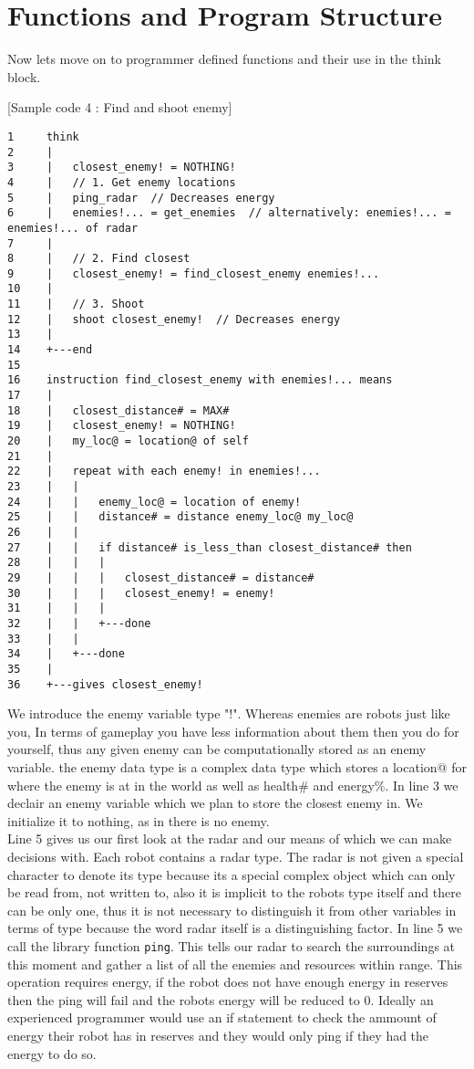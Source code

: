 \documentclass[a4paper]{article}
\begin{document}
\section{Functions and Program Structure}

Now lets move on to programmer defined functions and their use in the think block.

[Sample code 4 : Find and shoot enemy]
\begin{verbatim}
1     think
2     |
3     |   closest_enemy! = NOTHING!
4     |   // 1. Get enemy locations
5     |   ping_radar  // Decreases energy
6     |   enemies!... = get_enemies  // alternatively: enemies!... = enemies!... of radar
7     |
8     |   // 2. Find closest
9     |   closest_enemy! = find_closest_enemy enemies!...
10    |
11    |   // 3. Shoot
12    |   shoot closest_enemy!  // Decreases energy
13    |
14    +---end
15
16    instruction find_closest_enemy with enemies!... means
17    |
18    |   closest_distance# = MAX#
19    |   closest_enemy! = NOTHING!
20    |   my_loc@ = location@ of self
21    |
22    |   repeat with each enemy! in enemies!...
23    |   |
24    |   |   enemy_loc@ = location of enemy!
25    |   |   distance# = distance enemy_loc@ my_loc@
26    |   |
27    |   |   if distance# is_less_than closest_distance# then
28    |   |   |
29    |   |   |   closest_distance# = distance#
30    |   |   |   closest_enemy! = enemy!
31    |   |   |
32    |   |   +---done
33    |   |
34    |   +---done
35    |
36    +---gives closest_enemy!
\end{verbatim}

We introduce the enemy variable type "!". Whereas enemies are robots just like you, In terms of gameplay you have less information about them then you do for yourself, thus any given enemy can be computationally stored as an enemy variable. the enemy data type is a complex data type which stores a location@ for where the enemy is at in the world as well as health\# and energy\%. In line 3 we declair an enemy variable which we plan to store the closest enemy in. We initialize it to nothing, as in there is no enemy.\\

Line 5 gives us our first look at the radar and our means of which we can make decisions with. Each robot contains a radar type. The radar is not given a special character to denote its type because its a special complex object which can only be read from, not written to, also it is implicit to the robots type itself and there can be only one, thus it is not necessary to distinguish it from other variables in terms of type because the word radar itself is a distinguishing factor. In line 5 we call the library function \texttt{ping}. This tells our radar to search the surroundings at this moment and gather a list of all the enemies and resources within range. This operation requires energy, if the robot does not have enough energy in reserves then the ping will fail and the robots energy will be reduced to 0. Ideally an experienced programmer would use an if statement to check the ammount of energy their robot has in reserves and they would only ping if they had the energy to do so.\\
\end{document}
